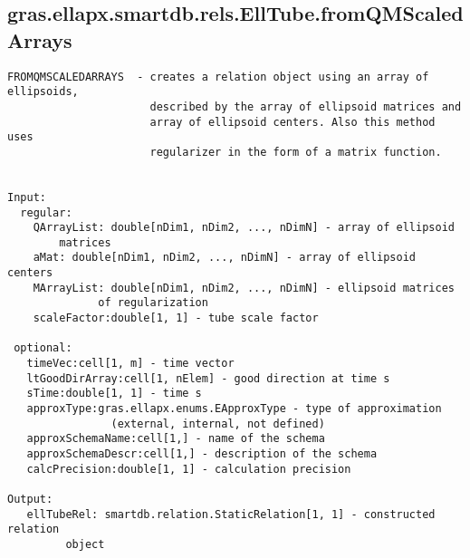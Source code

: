 \subsection{\texorpdfstring{gras.ellapx.smartdb.rels.EllTube.fromQMScaledArrays}{fromQMScaledArrays}}\label{method:gras.ellapx.smartdb.rels.EllTube.fromQMScaledArrays}
\begin{verbatim}
FROMQMSCALEDARRAYS  - creates a relation object using an array of ellipsoids,
                      described by the array of ellipsoid matrices and
                      array of ellipsoid centers. Also this method uses
                      regularizer in the form of a matrix function.


Input:
  regular:
    QArrayList: double[nDim1, nDim2, ..., nDimN] - array of ellipsoid
        matrices
    aMat: double[nDim1, nDim2, ..., nDimN] - array of ellipsoid centers
    MArrayList: double[nDim1, nDim2, ..., nDimN] - ellipsoid matrices
              of regularization
    scaleFactor:double[1, 1] - tube scale factor

 optional:
   timeVec:cell[1, m] - time vector
   ltGoodDirArray:cell[1, nElem] - good direction at time s
   sTime:double[1, 1] - time s
   approxType:gras.ellapx.enums.EApproxType - type of approximation
                (external, internal, not defined)
   approxSchemaName:cell[1,] - name of the schema
   approxSchemaDescr:cell[1,] - description of the schema
   calcPrecision:double[1, 1] - calculation precision

Output:
   ellTubeRel: smartdb.relation.StaticRelation[1, 1] - constructed relation
         object
\end{verbatim}
